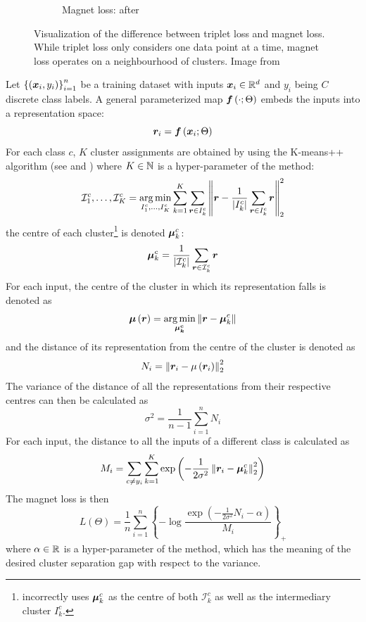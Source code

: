 \begin{figure}[h]
\begin{subfigure}[b]{0.245\textwidth}
    \caption{Magnet loss: after}
  \end{subfigure}
  \caption{Visualization of the difference between triplet loss and magnet loss. While triplet loss only considers one data point at a time, magnet loss operates on a neighbourhood of clusters. Image from \cite{rippel_metric_2015}}\label{fig:triplet-magnet-difference}
\end{figure}

Let \( \left\{ \left( \bm{x}_i, y_i \right) \right\}_{i = 1}^n \) be a training dataset with inputs \( \bm{x}_i \in \mathbb{R}^d \) and \( y_i \) being \( C \) discrete class labels. A general parameterized map \( \bm{f} \left( \cdot; \Theta \right) \) embeds the inputs into a representation space:
\[ \bm{r}_i = \bm{f} \left( \bm{x}_i; \Theta \right) \]
For each class \( c \), \( K \) cluster assignments are obtained by using the K-means++ algorithm (see \cite{macqueen_methods_1967} and \cite{arthur_k-means++:_2007}) where \( K \in \mathbb{N} \) is a hyper-parameter of the method:
\[ \mathcal{I}_1^c, \dots, \mathcal{I}_K^c = \operatorname*{arg\,min}_{I_1^c, \dots, I_K^c} \sum_{k = 1}^K \sum_{\bm{r} \in I_k^c} \left\lVert \bm{r} - \frac{1}{\left\lvert I_k^c \right\rvert} \sum_{\bm{r} \in I_k^c} \bm{r} \right\rVert_2^2  \]
the centre of each cluster\footnote{\cite{rippel_metric_2015} incorrectly uses \( \bm{\mu}_k^c \) as the centre of both \( \mathcal{I}_k^c \) as well as the intermediary cluster \( I_k^c \).} is denoted \( \bm{\mu}_k^c \):
\[ \bm{\mu}_k^c = \frac{1}{\left\lvert \mathcal{I}_k^c \right\rvert} \sum_{\bm{r} \in \mathcal{I}_k^c} \bm{r} \]
For each input, the centre of the cluster in which its representation falls is denoted as
\[ \bm{\mu} \left( \bm{r} \right) = \operatorname*{arg\,min}_{\bm{\mu_k^c}} \left\lVert \bm{r} - \bm{\mu}_k^c \right\rVert \]
and the distance of its representation from the centre of the cluster is denoted as
\[ N_i = \left\lVert \bm{r}_i - \mu \left( \bm{r}_i \right) \right\rVert_2^2 \]
The variance of the distance of all the representations from their respective centres can then be calculated as
\[ \sigma^2 = \frac{1}{n - 1} \sum_{i = 1}^n N_i \]
For each input, the distance to all the inputs of a different class is calculated as
\[ M_i = \sum_{c \neq y_i} \sum_{k = 1}^K \exp \left( - \frac{1}{2 \sigma^2} \left\lVert \bm{r}_i - \bm{\mu}_k^c \right\rVert_2^2 \right) \]
The magnet loss is then
\[ L \left( \Theta \right) = \frac{1}{n} \sum_{i = 1}^n \left\{ - \log \frac{\exp \left( - \frac{1}{2 \sigma^2} N_i - \alpha \right)}{M_i} \right\}_+ \]
where \( \alpha \in \mathbb{R} \) is a hyper-parameter of the method, which has the meaning of the desired cluster separation gap with respect to the variance.

